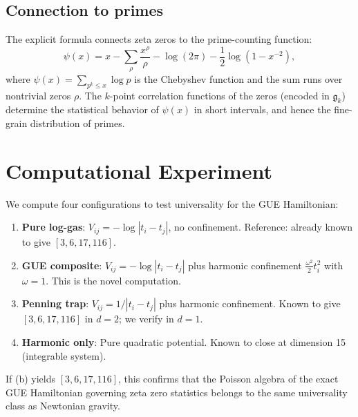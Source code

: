 \documentclass[11pt,a4paper]{article}
\begin{document}
\subsection{Connection to primes}

The explicit formula connects zeta zeros to the prime-counting function:
\begin{equation}\label{eq:explicit}
  \psi(x) = x - \sum_\rho \frac{x^\rho}{\rho}
           - \log(2\pi) - \frac{1}{2}\log(1 - x^{-2}),
\end{equation}
where $\psi(x) = \sum_{p^k \le x} \log p$ is the Chebyshev function and
the sum runs over nontrivial zeros $\rho$. The $k$-point correlation
functions of the zeros (encoded in $\mathfrak{g}_k$) determine the
statistical behavior of $\psi(x)$ in short intervals, and hence the
fine-grain distribution of primes.

\section{Computational Experiment}
\label{sec:experiment}

We compute four configurations to test universality for the GUE
Hamiltonian:

\begin{enumerate}
  \item[(a)] \textbf{Pure log-gas}: $V_{ij} = -\log|t_i - t_j|$,
    no confinement. Reference: already known to give $[3, 6, 17, 116]$.

  \item[(b)] \textbf{GUE composite}: $V_{ij} = -\log|t_i - t_j|$ plus
    harmonic confinement $\frac{\omega^2}{2}t_i^2$ with $\omega = 1$.
    This is the novel computation.

  \item[(c)] \textbf{Penning trap}: $V_{ij} = 1/|t_i - t_j|$ plus
    harmonic confinement. Known to give $[3, 6, 17, 116]$ in $d = 2$;
    we verify in $d = 1$.

  \item[(d)] \textbf{Harmonic only}: Pure quadratic potential. Known to
    close at dimension 15 (integrable system).
\end{enumerate}

If (b) yields $[3, 6, 17, 116]$, this confirms that the Poisson algebra
of the exact GUE Hamiltonian governing zeta zero statistics belongs to
the same universality class as Newtonian gravity.
\end{document}
